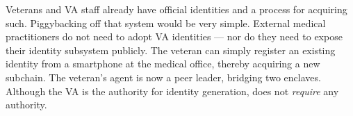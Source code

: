 %
%
%

Veterans and VA staff already have official identities and a process for acquiring such.
Piggybacking off that system would be very simple.
External medical practitioners do not need to adopt VA identities --- nor do they need to expose their identity subsystem publicly.
The veteran can simply register an existing identity from a smartphone at the medical office, thereby acquiring a new subchain.
The veteran's agent is now a peer leader, bridging two enclaves.
Although the VA is the authority for identity generation, \projectName does not \emph{require} any authority.
